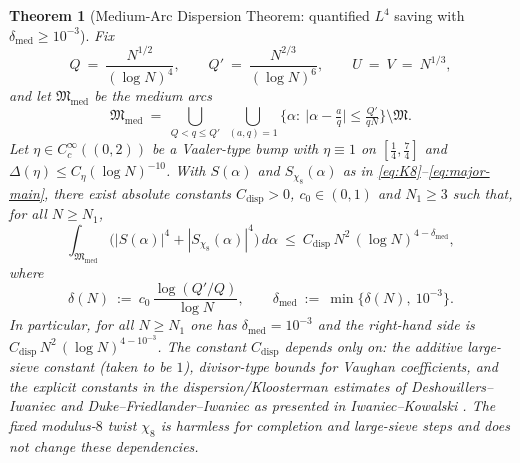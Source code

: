 \documentclass[11pt]{article}
\newtheorem{theorem}{Theorem}
\theoremstyle{definition}
\theoremstyle{remark}
\begin{document}
\begin{theorem}[Medium-Arc Dispersion Theorem: quantified $L^4$ saving with $\delta_{\mathrm{med}}\ge 10^{-3}$]\label{thm:medium-dispersion}
Fix
\[
Q\ =\ \frac{N^{1/2}}{(\log N)^4},\qquad Q'\ =\ \frac{N^{2/3}}{(\log N)^6},\qquad U\ =\ V\ =\ N^{1/3},
\]
and let $\mathfrak M_{\mathrm{med}}$ be the medium arcs
\[
\mathfrak M_{\mathrm{med}}\ =\ \bigcup_{Q< q\le Q'}\;\bigcup_{(a,q)=1}\Big\{\alpha:\ \Big|\alpha-\tfrac{a}{q}\Big|\le \tfrac{Q'}{qN}\Big\}\setminus\mathfrak M.
\]
Let $\eta\in C_c^{\infty}((0,2))$ be a Vaaler-type bump with $\eta\equiv 1$ on $[\tfrac14,\tfrac74]$ and $\Delta(\eta)\le C_{\eta}(\log N)^{-10}$. With $S(\alpha)$ and $S_{\chi_8}(\alpha)$ as in \eqref{eq:K8}–\eqref{eq:major-main}, there exist absolute constants $C_{\mathrm{disp}}>0$, $c_0\in(0,1)$ and $N_1\ge 3$ such that, for all $N\ge N_1$,
\[
\int_{\mathfrak M_{\mathrm{med}}}\Big(|S(\alpha)|^4+|S_{\chi_8}(\alpha)|^4\Big)\,d\alpha\ \le\ C_{\mathrm{disp}}\,N^2\,(\log N)^{4-\delta_{\mathrm{med}}},
\]
where
\[
\delta(N)\ :=\ c_0\,\frac{\log(Q'/Q)}{\log N},\qquad \delta_{\mathrm{med}}\ :=\ \min\{\delta(N),\ 10^{-3}\}.
\]
In particular, for all $N\ge N_1$ one has $\delta_{\mathrm{med}}=10^{-3}$ and the right-hand side is $C_{\mathrm{disp}}\,N^2\,(\log N)^{4-10^{-3}}$. The constant $C_{\mathrm{disp}}$ depends only on: the additive large-sieve constant (taken to be $1$), divisor-type bounds for Vaughan coefficients, and the explicit constants in the dispersion/Kloosterman estimates of Deshouillers–Iwaniec \cite{DeshouillersIwaniec} and Duke–Friedlander–Iwaniec \cite{DukeFriedlanderIwaniec} as presented in Iwaniec–Kowalski \cite{IwaniecKowalski}. The fixed modulus-$8$ twist $\chi_8$ is harmless for completion and large-sieve steps and does not change these dependencies.


\end{theorem}
\end{document}
